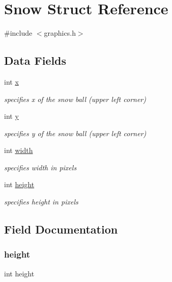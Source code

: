 \hypertarget{struct_snow}{}\section{Snow Struct Reference}
\label{struct_snow}


{\ttfamily \#include $<$graphics.\+h$>$}

\subsection*{Data Fields}
\begin{DoxyCompactItemize}
\item 
int \hyperlink{struct_snow_a6150e0515f7202e2fb518f7206ed97dc}{x}
\begin{DoxyCompactList}\small\item\em specifies x of the snow ball (upper left corner) \end{DoxyCompactList}\item 
int \hyperlink{struct_snow_a0a2f84ed7838f07779ae24c5a9086d33}{y}
\begin{DoxyCompactList}\small\item\em specifies y of the snow ball (upper left corner) \end{DoxyCompactList}\item 
int \hyperlink{struct_snow_a2474a5474cbff19523a51eb1de01cda4}{width}
\begin{DoxyCompactList}\small\item\em specifies width in pixels \end{DoxyCompactList}\item 
int \hyperlink{struct_snow_ad12fc34ce789bce6c8a05d8a17138534}{height}
\begin{DoxyCompactList}\small\item\em specifies height in pixels \end{DoxyCompactList}\end{DoxyCompactItemize}


\subsection{Field Documentation}
\mbox{\label{struct_snow_ad12fc34ce789bce6c8a05d8a17138534}} 
\subsubsection{\texorpdfstring{height}{height}}
{\footnotesize\ttfamily int height}



